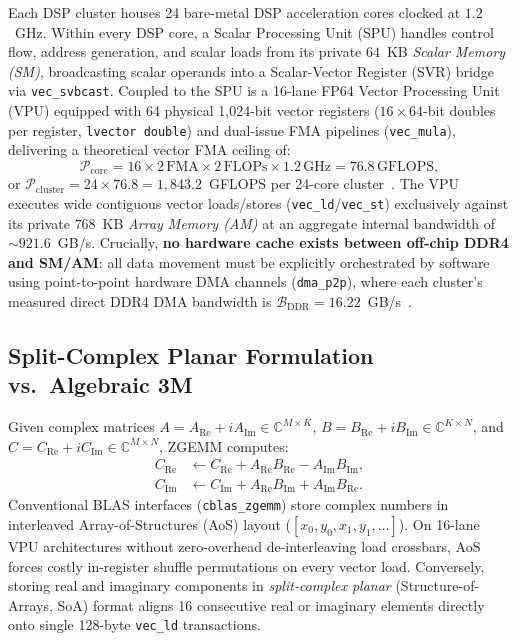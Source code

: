 \documentclass[conference]{IEEEtran}
\begin{document}
Each DSP cluster houses 24 bare-metal DSP acceleration cores clocked at $1.2$~GHz. Within every DSP core, a Scalar Processing Unit (SPU) handles control flow, address generation, and scalar loads from its private $64$~KB \emph{Scalar Memory (SM)}, broadcasting scalar operands into a Scalar-Vector Register (SVR) bridge via \texttt{vec\_svbcast}. Coupled to the SPU is a 16-lane FP64 Vector Processing Unit (VPU) equipped with 64 physical 1,024-bit vector registers ($16 \times 64$-bit doubles per register, \texttt{lvector double}) and dual-issue FMA pipelines (\texttt{vec\_mula}), delivering a theoretical vector FMA ceiling of:
\begin{equation}
\mathcal{P}_{\mathrm{core}} = 16 \times 2\,\text{FMA} \times 2\,\text{FLOPs} \times 1.2\,\text{GHz} = 76.8\,\text{GFLOPS},
\label{eq:core_peak}
\end{equation}
or $\mathcal{P}_{\mathrm{cluster}} = 24 \times 76.8 = 1{,}843.2$~GFLOPS per 24-core cluster~\cite{fang2026mtgemm}. The VPU executes wide contiguous vector loads/stores (\texttt{vec\_ld}/\texttt{vec\_st}) exclusively against its private $768$~KB \emph{Array Memory (AM)} at an aggregate internal bandwidth of $\sim\!921.6$~GB/s. Crucially, \textbf{no hardware cache exists between off-chip DDR4 and SM/AM}: all data movement must be explicitly orchestrated by software using point-to-point hardware DMA channels (\texttt{dma\_p2p}), where each cluster's measured direct DDR4 DMA bandwidth is $\mathcal{B}_{\mathrm{DDR}} = 16.22$~GB/s~\cite{qi2025constraint}.

\subsection{Split-Complex Planar Formulation vs.\ Algebraic 3M}
Given complex matrices $A = A_{\mathrm{Re}} + i A_{\mathrm{Im}} \in \mathbb{C}^{M \times K}$, $B = B_{\mathrm{Re}} + i B_{\mathrm{Im}} \in \mathbb{C}^{K \times N}$, and $C = C_{\mathrm{Re}} + i C_{\mathrm{Im}} \in \mathbb{C}^{M \times N}$, ZGEMM computes:
\begin{equation}
\begin{aligned}
C_{\mathrm{Re}} &\leftarrow C_{\mathrm{Re}} + A_{\mathrm{Re}} B_{\mathrm{Re}} - A_{\mathrm{Im}} B_{\mathrm{Im}}, \\
C_{\mathrm{Im}} &\leftarrow C_{\mathrm{Im}} + A_{\mathrm{Re}} B_{\mathrm{Im}} + A_{\mathrm{Im}} B_{\mathrm{Re}}.
\end{aligned}
\label{eq:zgemm_4m}
\end{equation}
Conventional BLAS interfaces (\texttt{cblas\_zgemm}) store complex numbers in interleaved Array-of-Structures (AoS) layout ($[x_0, y_0, x_1, y_1, \dots]$). On 16-lane VPU architectures without zero-overhead de-interleaving load crossbars, AoS forces costly in-register shuffle permutations on every vector load. Conversely, storing real and imaginary components in \emph{split-complex planar} (Structure-of-Arrays, SoA) format aligns 16 consecutive real or imaginary elements directly onto single 128-byte \texttt{vec\_ld} transactions.
\end{document}
